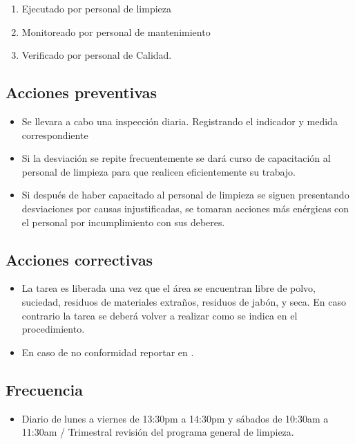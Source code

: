 \begin{enumerate}
	\item Ejecutado por personal de limpieza
	\item Monitoreado por personal de mantenimiento
	\item Verificado por personal de Calidad.
\end{enumerate}

\subsection{Acciones preventivas}

\begin{itemize}
	\item Se llevara a cabo una inspección diaria. Registrando el indicador y medida correspondiente
	\item Si la desviación se repite frecuentemente se dará curso de capacitación al personal de limpieza para que realicen eficientemente su trabajo.
	\item Si después de haber capacitado al personal de limpieza se siguen presentando desviaciones por causas injustificadas, se tomaran acciones más enérgicas con el personal por incumplimiento con sus deberes.
\end{itemize}

\subsection{Acciones correctivas}

\begin{itemize}
	\item La tarea es liberada una vez que el área se encuentran libre de polvo, suciedad, residuos de materiales extraños, residuos de jabón, y seca. En caso contrario la tarea se deberá volver a realizar como se indica en el procedimiento.
	\item En caso de no conformidad reportar en \RAC.
\end{itemize}

\subsection{Frecuencia}

\begin{itemize}
	\item Diario de lunes a viernes de 13:30pm a 14:30pm y sábados de 10:30am a 11:30am / Trimestral revisión del programa general de limpieza.
\end{itemize}

